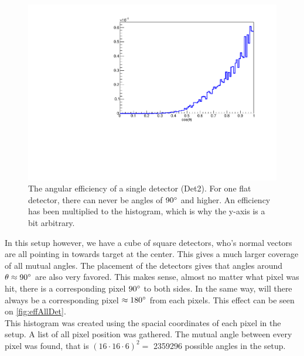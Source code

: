 \begin{figure}[h]
	\includegraphics[width=\linewidth]{../figures/det2Eff.pdf}
	\caption{The angular efficiency of a single detector (Det2). For one flat detector, there can never be angles of $90\degree$ and higher. An efficiency has been multiplied to the histogram, which is why the y-axis is a bit arbitrary.}
	\label{fig:oneDetEff}
\end{figure}
In this setup however, we have a cube of square detectors, who's normal vectors are all pointing in towards target at the center. This gives a much larger coverage of all mutual angles. 
The placement of the detectors gives that angles around $\theta \approx 90 \degree$ are also very favored. This makes sense, almost no matter what pixel was hit, there is a corresponding pixel $90\degree$ to both sides. In the same way, will there always be a corresponding pixel $\approx 180\degree$ from each pixels. This effect can be seen on \cref{fig:effAllDet}. \\
This histogram was created using the spacial coordinates of each pixel in the setup. A list of all pixel position was gathered. The mutual angle between every pixel was found, that is $(16\cdot 16 \cdot 6)^2 =$ \num[group-separator={,}]{2359296} possible angles in the setup. 


